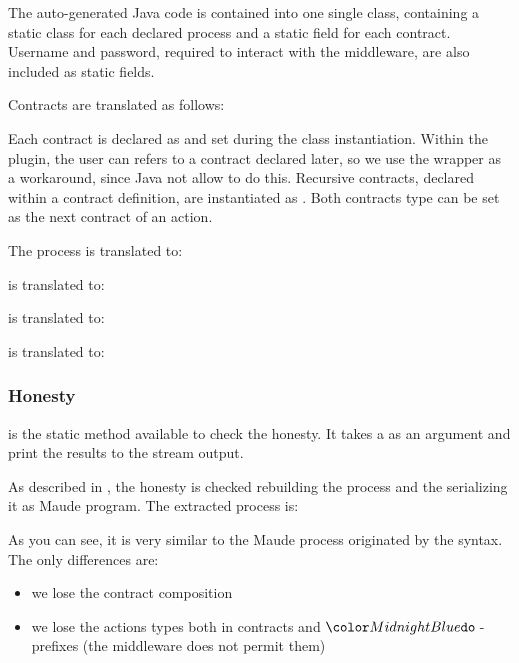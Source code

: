 The auto-generated Java code is contained into one single class, containing a static class for each declared process and a static field for each contract. Username and password, required to interact with the middleware, are also included as static fields.

Contracts are translated as follows:

Each contract is declared as  and set during the class instantiation. Within the plugin, the user can refers to a contract declared later, so we use the wrapper as a workaround, since Java not allow to do this. Recursive contracts, declared within a contract definition, are instantiated as . Both contracts type can be set as the next contract of an action.

The process  is translated to:

 is translated to:

 is translated to:

 is translated to:


\subsubsection{Honesty}
 is the static method available to check the honesty. It takes a  as an argument and print the results to the stream output.

As described in , the honesty is checked rebuilding the \coco process and the serializing it as Maude program. The extracted process is:

As you can see, it is very similar to the Maude process originated by the \coco syntax. The only differences are:
\begin{itemize}
	\item we lose the contract composition
	\item we lose the actions types both in contracts and $\fact{}{}$-prefixes (the middleware does not permit them)
\end{itemize}

